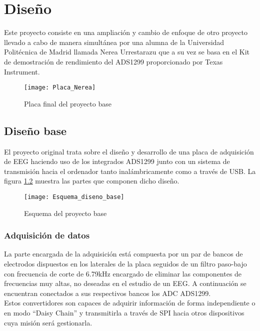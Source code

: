 \chapter{Diseño\label{sec:Diseno}}

Este proyecto consiste en una ampliación y cambio de enfoque de otro proyecto llevado a cabo de manera simultánea por una alumna de la Universidad Politécnica de Madrid llamada Nerea Urrestarazu que a su vez se basa en el Kit de demostración de rendimiento del ADS1299 proporcionado por Texas Instrument.

\begin{figure} [h]
    \centering
    \texttt{[image: Placa\_Nerea]}
    \caption{Placa final del proyecto base}
    \label{fig:Placa_base}
\end{figure}

\section{Diseño base\label{sec:Diseno_base_N}}

El proyecto original trata sobre el diseño y desarrollo de una placa de adquisición de EEG haciendo uso de los integrados ADS1299 junto con un sistema de transmisión hacia el ordenador tanto inalámbricamente como a través de USB. La figura \ref{fig:Diseno_base} muestra las partes que componen dicho diseño.

\begin{figure} [h]
    \centering
    \texttt{[image: Esquema\_diseno\_base]}
    \caption{Esquema del proyecto base}
    \label{fig:Diseno_base}
\end{figure}

\subsection{Adquisición de datos\label{sec:Adquisicion_N}}

La parte encargada de la adquisición está compuesta por un par de bancos de electrodos dispuestos en los laterales de la placa seguidos de un filtro paso-bajo con frecuencia de corte de 6.79kHz encargado de eliminar las componentes de frecuencias muy altas, no deseadas en el estudio de un \acrshort{EEG}. A continuación se encuentran conectados a sus respectivos bancos los \acrshort{ADC} ADS1299. 
\\Estos convertidores son capaces de adquirir información de forma independiente o en modo ``Daisy Chain'' y transmitirla a través de \acrshort{SPI} hacia otros dispositivos cuya misión será gestionarla.

